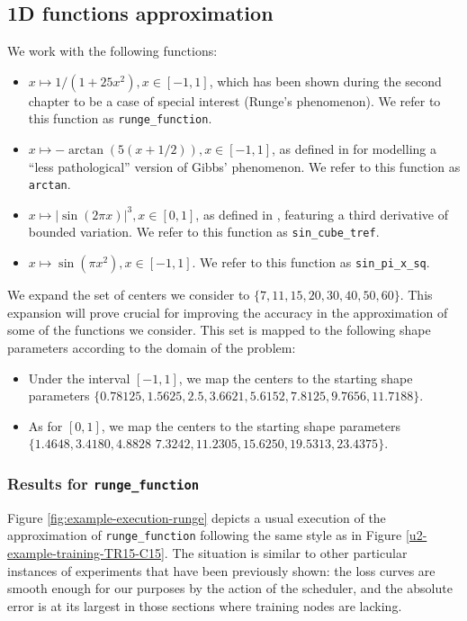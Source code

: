 \documentclass[12pt]{report} %
\begin{document}
\subsection*{1D functions approximation}
We work with the following functions:
\begin{itemize}
  \item $x \mapsto 1/(1+25x^2), x\in[-1,1]$, which has been shown during the second chapter to be a case of special interest (Runge's phenomenon). We refer to this function as \texttt{runge\_function}.
  \item $x \mapsto -\arctan(5(x+1/2)), x\in[-1,1]$, as defined in \cite{fornberg2002observations} for modelling a ``less pathological'' version of Gibbs' phenomenon. We refer to this function as \texttt{arctan}.
  \item $x \mapsto |\sin(2\pi x)|^3, x\in[0,1]$, as defined in \cite{trefethen2000spectral}, featuring a third derivative of bounded variation. We refer to this function as \texttt{sin\_cube\_tref}.
  \item $x\mapsto \sin(\pi x ^2), x \in [-1,1]$. We refer to this function as \texttt{sin\_pi\_x\_sq}.
\end{itemize}

We expand the set of centers we consider to $\{7,11,15,20,30,40,50,60\}$. This expansion will prove crucial for improving the accuracy in the approximation of some of the functions we consider. This set is mapped to the following shape parameters according to the domain of the problem:
\begin{itemize}
  \item Under the interval $[-1,1]$, we map the centers to the starting shape parameters $\{0.78125, 1.5625, 2.5,3.6621, 5.6152, 7.8125,9.7656, 11.7188\}$.
  \item As for $[0,1]$, we map the centers to the starting shape parameters $\{1.4648,  3.4180, 4.8828$ $  7.3242, 11.2305, 15.6250,19.5313, 23.4375\}$.
\end{itemize}


\subsubsection*{Results for \texttt{runge\_function}}

Figure \ref{fig:example-execution-runge} depicts a usual execution of the approximation of \texttt{runge\_function} following the same style as in Figure \ref{u2-example-training-TR15-C15}. The situation is similar to other particular instances of experiments that have been previously shown: the loss curves are smooth enough for our purposes by the action of the scheduler, and the absolute error is at its largest in those sections where training nodes are lacking.
\end{document}
